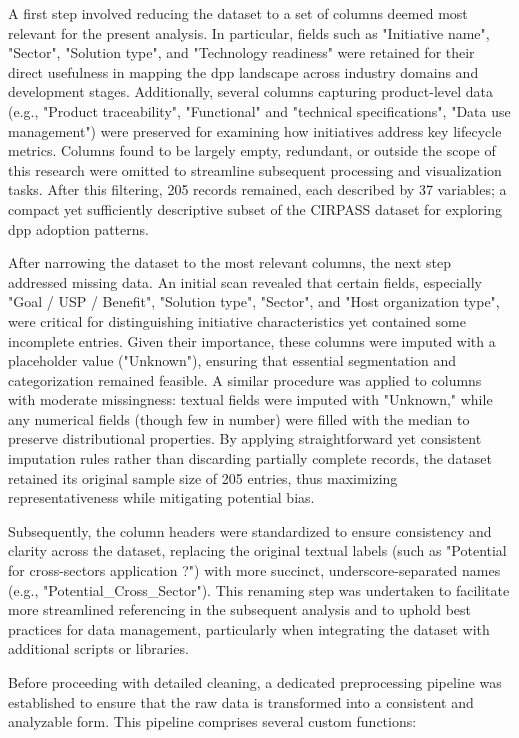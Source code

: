 A first step involved reducing the dataset to a set of columns deemed most relevant for the present analysis. In particular, fields such as "Initiative name", "Sector", "Solution type", and "Technology readiness" were retained for their direct usefulness in mapping the \ac{dpp} landscape across industry domains and development stages. Additionally, several columns capturing product-level data (e.g., "Product traceability", "Functional" and "technical specifications", "Data use management") were preserved for examining how initiatives address key lifecycle metrics. Columns found to be largely empty, redundant, or outside the scope of this research were omitted to streamline subsequent processing and visualization tasks. After this filtering, 205 records remained, each described by 37 variables; a compact yet sufficiently descriptive subset of the CIRPASS dataset for exploring \ac{dpp} adoption patterns.

After narrowing the dataset to the most relevant columns, the next step addressed missing data. An initial scan revealed that certain fields, especially "Goal / USP / Benefit", "Solution type", "Sector", and "Host organization type", were critical for distinguishing initiative characteristics yet contained some incomplete entries. Given their importance, these columns were imputed with a placeholder value ("Unknown"), ensuring that essential segmentation and categorization remained feasible. A similar procedure was applied to columns with moderate missingness: textual fields were imputed with "Unknown," while any numerical fields (though few in number) were filled with the median to preserve distributional properties. By applying straightforward yet consistent imputation rules rather than discarding partially complete records, the dataset retained its original sample size of 205 entries, thus maximizing representativeness while mitigating potential bias.

Subsequently, the column headers were standardized to ensure consistency and clarity across the dataset, replacing the original textual labels (such as "Potential for cross-sectors application ?") with more succinct, underscore-separated names (e.g., "Potential\_Cross\_Sector"). This renaming step was undertaken to facilitate more streamlined referencing in the subsequent analysis and to uphold best practices for data management, particularly when integrating the dataset with additional scripts or libraries.

Before proceeding with detailed cleaning, a dedicated preprocessing pipeline was established to ensure that the raw data is transformed into a consistent and analyzable form. This pipeline comprises several custom functions:

